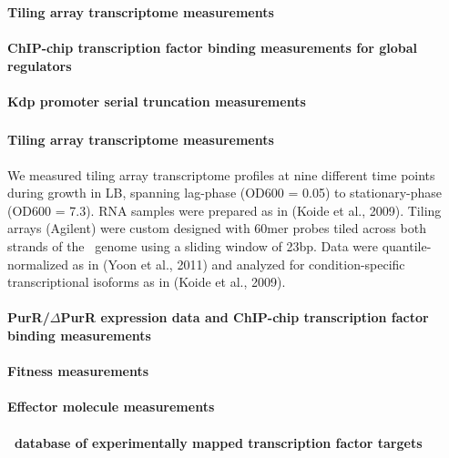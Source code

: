 
\subsubsection{\halo}\label{halodata}

\paragraph{Tiling array transcriptome measurements}
\paragraph{ChIP-chip transcription factor binding measurements for global regulators}
\paragraph{Kdp promoter serial truncation measurements}

\subsubsection{\eco}\label{ecodata}

\paragraph{Tiling array transcriptome measurements}

We measured \eco tiling array transcriptome profiles at nine
different time points during growth in LB, spanning lag-phase (OD600 =
0.05) to stationary-phase (OD600 = 7.3). RNA samples were prepared as
in (Koide et al., 2009). Tiling arrays (Agilent) were custom designed
with 60mer probes tiled across both strands of the \eco\ 
genome using a sliding window of 23bp. Data were quantile-normalized
as in (Yoon et al., 2011) and analyzed for condition-specific
transcriptional isoforms as in (Koide et al., 2009).

\paragraph{PurR/$\Delta$PurR expression data and ChIP-chip transcription factor binding measurements} 
\paragraph{Fitness measurements}
\paragraph{Effector molecule measurements}
\paragraph{\rdb\  database of experimentally mapped transcription factor targets}
